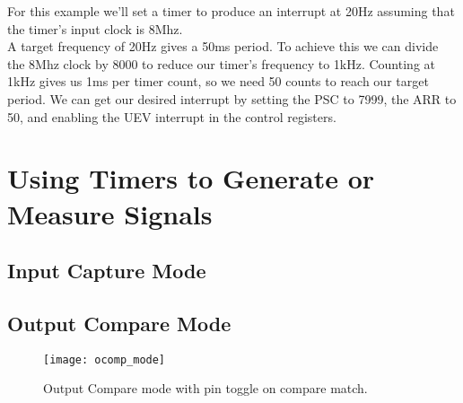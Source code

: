 \documentclass[11pt,fleqn]{book} %
\begin{document}
            
        \begin{center}
            \begin{example} 
               For this example we'll set a timer to produce an interrupt at 20Hz assuming that the timer's input clock is 8Mhz. \\
               
               A target frequency of 20Hz gives a 50ms period. To achieve this we can divide the 8Mhz clock by 8000 to reduce our timer's frequency to 1kHz. Counting at 1kHz gives us 1ms per timer count, so we need 50 counts to reach our target period. We can get our desired interrupt by setting the PSC to 7999, the ARR to 50, and enabling the UEV interrupt in the control registers. 
            \end{example}
        \end{center}
        
    

\section{Using Timers to Generate or Measure Signals}
%    
    
    \subsection{Input Capture Mode}
    
    \subsection{Output Compare Mode}
%        
%        
        \begin{figure}[]
            \centering\texttt{[image: ocomp\_mode]}
            \caption{Output Compare mode with pin toggle on compare match.}
            \label{ocomp_mode}
        \end{figure}
    
\end{document}
